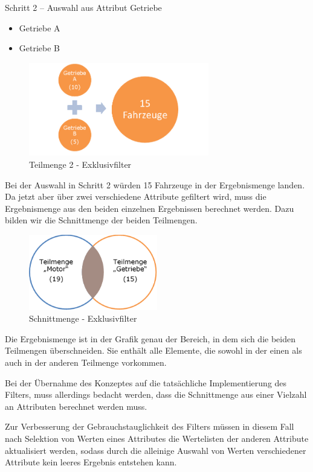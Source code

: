Schritt 2 – Auswahl aus Attribut Getriebe
\begin{itemize}
	\item Getriebe A
	\item Getriebe B
\end{itemize}

\begin{figure}[H]
 \centering
 \includegraphics[width=0.7\textwidth]{grafiken/Filter_Getriebe.png}
 \caption{Teilmenge 2 - Exklusivfilter}
 \label{fig:filter3}
\end{figure}

Bei der Auswahl in Schritt 2 würden 15 Fahrzeuge in der Ergebnismenge landen. Da jetzt aber über zwei verschiedene Attribute gefiltert wird, muss die Ergebnismenge aus den beiden einzelnen Ergebnissen berechnet werden. Dazu bilden wir die Schnittmenge der beiden Teilmengen.

\begin{figure}[H]
 \centering
 \includegraphics[width=0.5\textwidth]{grafiken/Filter_Schnitt.png}
 \caption{Schnittmenge - Exklusivfilter}
 \label{fig:filter4}
\end{figure}

Die Ergebnismenge ist in der Grafik genau der Bereich, in dem sich die beiden Teilmengen überschneiden. Sie enthält alle Elemente, die sowohl in der einen als auch in der anderen Teilmenge vorkommen.

Bei der Übernahme des Konzeptes auf die tatsächliche Implementierung des Filters, muss allerdings bedacht werden, dass die Schnittmenge aus einer Vielzahl an Attributen berechnet werden muss.

Zur Verbesserung der Gebrauchstauglichkeit des Filters müssen in diesem Fall nach Selektion von Werten eines Attributes die Wertelisten der anderen Attribute aktualisiert werden, sodass durch die alleinige Auswahl von Werten verschiedener Attribute kein leeres Ergebnis entstehen kann.

